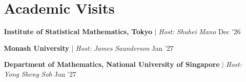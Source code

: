 \section{Academic Visits}
\resumeSubHeadingListStart

\resumeProjectHeading
{\textbf{Institute of Statistical Mathematics, Tokyo} $|$ \textit{Host: Shuhei Mano}}
{\color{grey}Dec '26}
{}{}
\vspace{\mygap}


\resumeProjectHeading
{\textbf{Monash University} $|$ \textit{Host: James Saunderson}}
{\color{grey}Jan '27}
{}{}
\vspace{\mygap}

\resumeProjectHeading
{\textbf{Department of Mathematics, National University of Singapore} $|$ \textit{Host: Yong Sheng Soh}}
{\color{grey}Jan '27}
{}{}
\vspace{\mygap}


